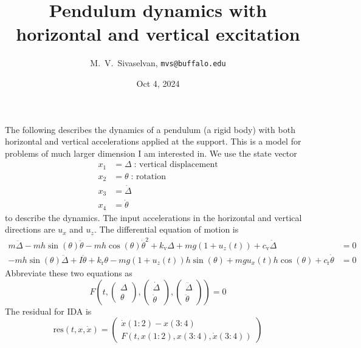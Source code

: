 \documentclass{article}
\title{Pendulum dynamics with horizontal and vertical excitation}
\author{M.~V.~Sivaselvan, \texttt{mvs@buffalo.edu}}
\date{Oct 4, 2024}
\newcommand{\kv}{k_\text{v}}
\newcommand{\kr}{k_\text{r}}
\newcommand{\cv}{c_\text{v}}
\newcommand{\crr}{c_\text{r}}
\begin{document}
\maketitle

The following describes the dynamics of a pendulum (a rigid body) with both 
horizontal and vertical accelerations applied at the support.
This is a model for problems of much larger dimension I am interested in.
We use the state vector
\begin{equation*}
    \begin{aligned}
        x_1 &= \Delta\; \text{: vertical displacement} \\
        x_2 &= \theta\; \text{: rotation} \\
        x_3 &= \dot{\Delta} \\
        x_4 &= \dot{\theta}
    \end{aligned}
\end{equation*}
to describe the dynamics. The input accelerations in the horizontal and vertical 
directions are $u_x$ and $u_z$. The differential equation of motion is
\begin{equation*}
    \begin{aligned}
        m\ddot{\Delta} -m h \sin(\theta)\ddot{\theta} 
            -m h \cos(\theta) \dot{\theta}^2 + \kv\Delta + m g (1+u_z(t)) + \cv\dot{\Delta} &= 0\\
        -m h \sin(\theta)\ddot{\Delta} + I\ddot{\theta}
            + \kr\theta - m g (1+u_z(t)) h \sin(\theta) 
            + m g u_x(t) h \cos(\theta) + \crr\dot{\theta} &= 0
    \end{aligned}
\end{equation*}
Abbreviate these two equations as
\begin{equation*}
    F\left(t,
           \begin{pmatrix}\Delta \\ \theta\end{pmatrix},
           \begin{pmatrix}\dot{\Delta} \\ \dot{\theta}\end{pmatrix},
           \begin{pmatrix}\ddot{\Delta} \\ \ddot{\theta}\end{pmatrix}
           \right) = 0
\end{equation*}
The residual for IDA is 
\begin{equation*}
    \text{res}(t,x,\dot{x}) = \begin{pmatrix} 
                                  \dot{x}(1:2) - x(3:4) \\
                                  F\left(t,x(1:2),x(3:4),\dot{x}(3:4)\right)
                              \end{pmatrix}
\end{equation*}
\end{document}
